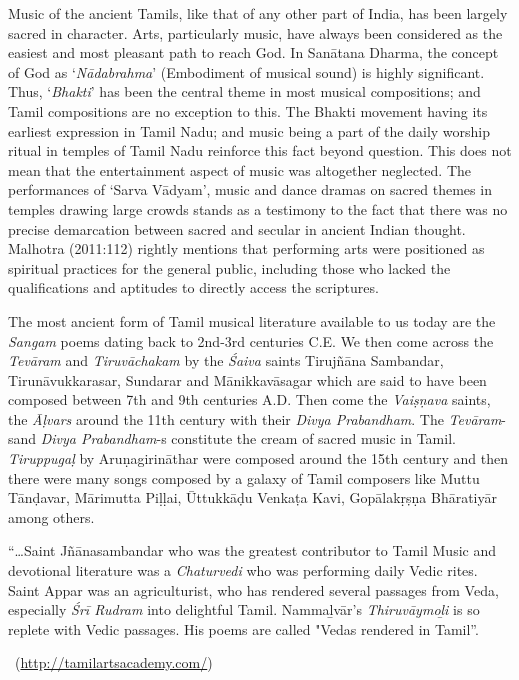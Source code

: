 Music of the ancient Tamils, like that of any other part of India, has been largely sacred in character. Arts, particularly music, have always been considered as the easiest and most pleasant path to reach God. In Sanātana Dharma, the concept of God as ‘\textit{Nādabrahma}’ (Embodiment of musical sound) is highly significant. Thus, ‘\textit{Bhakti}’ has been the central theme in most musical compositions; and Tamil compositions are no exception to this. The Bhakti movement having its earliest expression in Tamil Nadu; and music being a part of the daily worship ritual in temples of Tamil Nadu reinforce this fact beyond question. This does not mean that the entertainment aspect of music was altogether neglected. The performances of ‘Sarva Vādyam’, music and dance dramas on sacred themes in temples drawing large crowds stands as a testimony to the fact that there was no precise demarcation between sacred and secular in ancient Indian thought. Malhotra (2011:112) rightly mentions that performing arts were positioned as spiritual practices for the general public, including those who lacked the qualifications and aptitudes to directly access the scriptures. 

The most ancient form of Tamil musical literature available to us today are the \textit{Sangam} poems dating back to 2nd-3rd centuries C.E. We then come across the \textit{Tevāram} and \textit{Tiruvāchakam} by the \textit{Śaiva} saints Tirujñāna Sambandar, Tirunāvukkarasar, Sundarar and Mānikkavāsagar which are said to have been composed between 7th and 9th centuries A.D. Then come the \textit{Vaiṣṇava} saints, the \textit{Āḷvars }around the 11th century with their \textit{Divya Prabandham}. The \textit{Tevāram}-sand \textit{Divya Prabandham}-s constitute the cream of sacred music in Tamil. \textit{Tiruppugaḷ} by Aruṇagirināthar were composed around the 15th century and then there were many songs composed by a galaxy of Tamil composers like Muttu Tānḍavar, Mārimutta Piḷḷai, Ūttukkāḍu Venkaṭa Kavi, Gopālakṛṣṇa Bhāratiyār among others.

\begin{myquote}
“…Saint Jñānasambandar who was the greatest contributor to Tamil Music and devotional literature was a \textit{Chaturvedi} who was performing daily Vedic rites. Saint Appar was an agriculturist, who has rendered several passages from Veda, especially \textit{Śrī Rudram} into delightful Tamil. Nammaḻvār's \textit{Thiruvāymoḻi} is so replete with Vedic passages. His poems are called "Vedas rendered in Tamil”.

~\hfill (\url{http://tamilartsacademy.com/})
\end{myquote}

